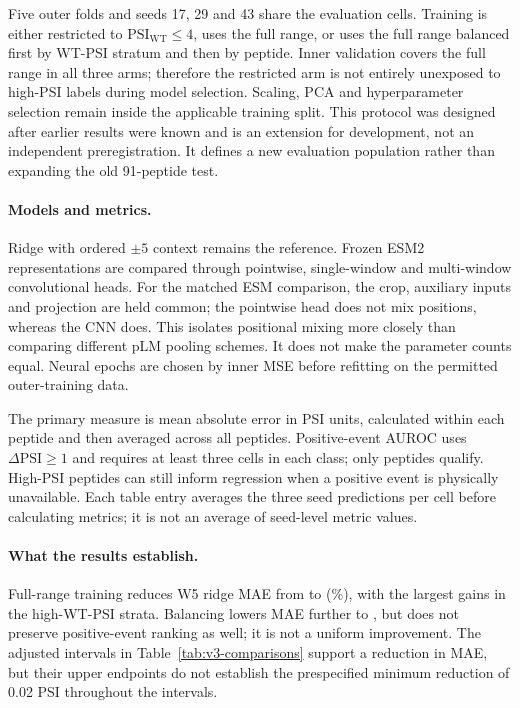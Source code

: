 Five outer folds and seeds 17, 29 and 43 share the evaluation cells. Training is either restricted
to $\mathrm{PSI}_{\mathrm{WT}}\le4$, uses the full range, or uses the full range balanced first by
WT-PSI stratum and then by peptide. Inner validation covers the full range in all three arms;
therefore the restricted arm is not entirely unexposed to high-PSI labels during model selection.
Scaling, PCA and hyperparameter selection remain inside the applicable training split. This protocol
was designed after earlier results were known and is an extension for development, not an independent
preregistration. It defines a new evaluation population rather than expanding the old 91-peptide test.

\paragraph{Models and metrics.}
Ridge with ordered $\pm5$ context remains the reference. Frozen ESM2 representations
\citep{lin2023esm} are compared through pointwise, single-window and multi-window convolutional heads.
For the matched ESM comparison, the crop, auxiliary inputs and projection are held common; the
pointwise head does not mix positions, whereas the CNN does. This isolates positional mixing more
closely than comparing different pLM pooling schemes. It does not make the parameter counts equal.
Neural epochs are chosen by inner MSE before refitting on the permitted outer-training data.

The primary measure is mean absolute error in PSI units, calculated within each peptide and then
averaged across all \nVthreeNPeptides{} peptides. Positive-event AUROC uses
$\Delta\mathrm{PSI}\ge1$ and requires at least three cells in each class; only
\nVthreePlusEligible{} peptides qualify. High-PSI peptides can still inform regression when a positive
event is physically unavailable. Each table entry averages the three seed predictions per cell
before calculating metrics; it is not an average of seed-level metric values.

\begin{table}[htbp]
  \centering
  \caption[Selected full-PSI development results]{Selected full-PSI development results. MAE is lower-is-better; positive AUROC is higher-is-better.
  All rows use the same evaluation population and three-seed prediction ensemble.}
  \label{tab:v3-results}
  
\end{table}

\paragraph{What the results establish.}
Full-range training reduces W5 ridge MAE from \nVthreeRidgeB{} to \nVthreeRidgeD{}
(\nVthreeRidgeGain\%), with the largest gains in the high-WT-PSI strata. Balancing lowers MAE
further to \nVthreeRidgeE{}, but does not preserve positive-event ranking as well; it is not a
uniform improvement. The adjusted intervals in Table~\ref{tab:v3-comparisons} support a reduction
in MAE, but their upper endpoints do not establish the prespecified minimum reduction of 0.02 PSI
throughout the intervals.

